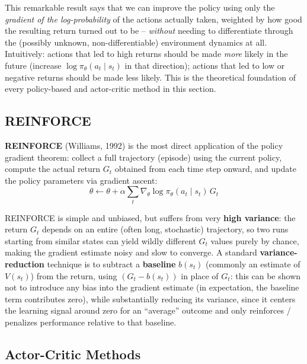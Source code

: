 \documentclass[12pt,a4paper]{article}
\begin{document}
\begin{keyidea}
This remarkable result says that we can improve the policy using only the \emph{gradient of the log-probability} of the actions actually taken, weighted by how good the resulting return turned out to be -- \emph{without} needing to differentiate through the (possibly unknown, non-differentiable) environment dynamics at all. Intuitively: actions that led to high returns should be made \emph{more} likely in the future (increase $\log\pi_\theta(a_t\mid s_t)$ in that direction); actions that led to low or negative returns should be made less likely. This is the theoretical foundation of every policy-based and actor-critic method in this section.
\end{keyidea}

\subsection{REINFORCE}

\begin{defbox}
\textbf{REINFORCE} (Williams, 1992) is the most direct application of the policy gradient theorem: collect a full trajectory (episode) using the current policy, compute the actual return $G_t$ obtained from each time step onward, and update the policy parameters via gradient ascent:
\[
\theta \leftarrow \theta + \alpha \sum_t \nabla_\theta \log\pi_\theta(a_t\mid s_t)\, G_t
\]
\end{defbox}

\begin{keyidea}
REINFORCE is simple and unbiased, but suffers from very \textbf{high variance}: the return $G_t$ depends on an entire (often long, stochastic) trajectory, so two runs starting from similar states can yield wildly different $G_t$ values purely by chance, making the gradient estimate noisy and slow to converge. A standard \textbf{variance-reduction} technique is to subtract a \textbf{baseline} $b(s_t)$ (commonly an estimate of $V(s_t)$) from the return, using $(G_t - b(s_t))$ in place of $G_t$: this can be shown not to introduce any bias into the gradient estimate (in expectation, the baseline term contributes zero), while substantially reducing its variance, since it centers the learning signal around zero for an ``average'' outcome and only reinforces / penalizes performance relative to that baseline.
\end{keyidea}

\subsection{Actor-Critic Methods}
\end{document}
